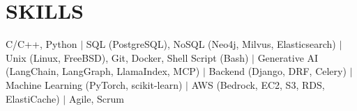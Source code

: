 \documentclass[letterpaper,11pt]{article}
\begin{document}
\section{SKILLS}
\noindent\small C/C++, Python $|$ SQL (PostgreSQL), NoSQL (Neo4j, Milvus, Elasticsearch) $|$ Unix (Linux, FreeBSD), Git, Docker, Shell Script (Bash) $|$ Generative AI (LangChain, LangGraph, LlamaIndex, MCP) $|$ Backend (Django, DRF, Celery) $|$ Machine Learning (PyTorch, scikit-learn) $|$ AWS (Bedrock, EC2, S3, RDS, ElastiCache) $|$ Agile, Scrum
\vspace{2pt}
\end{document}
